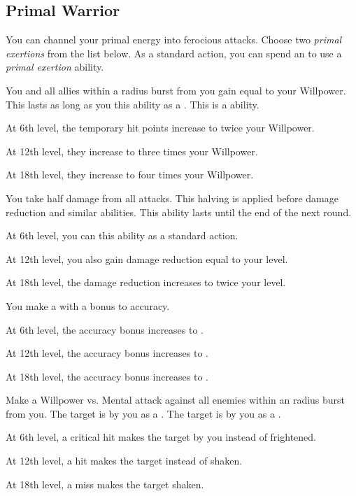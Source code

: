     \subsection{Primal Warrior}
        You can channel your primal energy into ferocious attacks.
        Choose two \textit{primal exertions} from the list below.
        As a standard action, you can spend an  to use a \textit{primal exertion} ability.
        {
             You and all allies within a \arealarge radius burst from you gain  equal to your Willpower.
            This lasts as long as you  this ability as a .
            This is a  ability.
            \par At 6th level, the temporary hit points increase to twice your Willpower.
            \par At 12th level, they increase to three times your Willpower.
            \par At 18th level, they increase to four times your Willpower.

             You take half damage from all attacks.
            This halving is applied before damage reduction and similar abilities.
            This ability lasts until the end of the next round.
            \par At 6th level, you can  this ability as a standard action.
            \par At 12th level, you also gain damage reduction equal to your level.
            \par At 18th level, the damage reduction increases to twice your level.

             You make a  with a  bonus to accuracy.
            \par At 6th level, the accuracy bonus increases to .
            \par At 12th level, the accuracy bonus increases to .
            \par At 18th level, the accuracy bonus increases to .

            Make a Willpower vs. Mental attack against all enemies within an \arealarge radius burst from you.
             The target is \shaken by you as a .
             The target is \frightened by you as a .
            \par At 6th level, a critical hit makes the target \panicked by you instead of frightened.
            \par At 12th level, a hit makes the target \frightened instead of shaken.
            \par At 18th level, a miss makes the target shaken.

}
